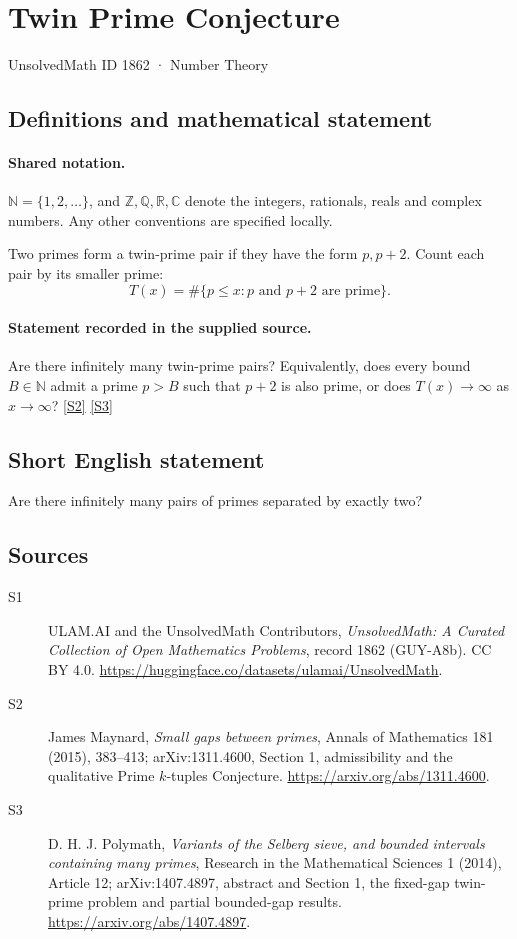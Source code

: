 \documentclass[11pt]{article}
\newcommand{\sref}[2]{\hyperlink{source:#1:#2}{[S#2]}}
\begin{document}
\setcounter{section}{1861}
\section{Twin Prime Conjecture}\label{1862}
{\small\sffamily UnsolvedMath ID 1862 · Number Theory}
\subsection{Definitions and mathematical statement}

\paragraph{Shared notation.}$\mathbb N=\{1,2,\ldots\}$, and $\mathbb Z,\mathbb Q,\mathbb R,\mathbb C$ denote the integers, rationals, reals and complex numbers. Any other conventions are specified locally.


Two primes form a twin-prime pair if they have the form
\(p,p+2\). Count each pair by its smaller prime:
\[
                   T(x)=\#\{p\le x:p\text{ and }p+2\text{ are prime}\}.
\]
\paragraph{Statement recorded in the supplied source.}
Are there infinitely many twin-prime pairs? Equivalently,
does every bound \(B\in\mathbb N\) admit a prime \(p>B\) such that
\(p+2\) is also prime, or does \(T(x)\to\infty\) as \(x\to\infty\)? \sref{1862}{2} \sref{1862}{3}
\subsection{Short English statement}
Are there infinitely many pairs of primes separated by exactly two?
\subsection{Sources}
\begin{description}
\item[\hypertarget{source:1862:1}{S1}] ULAM.AI and the UnsolvedMath Contributors, \emph{UnsolvedMath: A Curated Collection of Open Mathematics Problems}, record 1862 (GUY-A8b). CC BY 4.0. \url{https://huggingface.co/datasets/ulamai/UnsolvedMath}.
\item[\hypertarget{source:1862:2}{S2}] James Maynard, \emph{Small gaps between primes}, Annals of Mathematics 181 (2015), 383--413; arXiv:1311.4600, Section 1, admissibility and the qualitative Prime $k$-tuples Conjecture. \url{https://arxiv.org/abs/1311.4600}.
\item[\hypertarget{source:1862:3}{S3}] D. H. J. Polymath, \emph{Variants of the Selberg sieve, and bounded intervals containing many primes}, Research in the Mathematical Sciences 1 (2014), Article 12; arXiv:1407.4897, abstract and Section 1, the fixed-gap twin-prime problem and partial bounded-gap results. \url{https://arxiv.org/abs/1407.4897}.
\end{description}
\label{end:1862}
\end{document}
